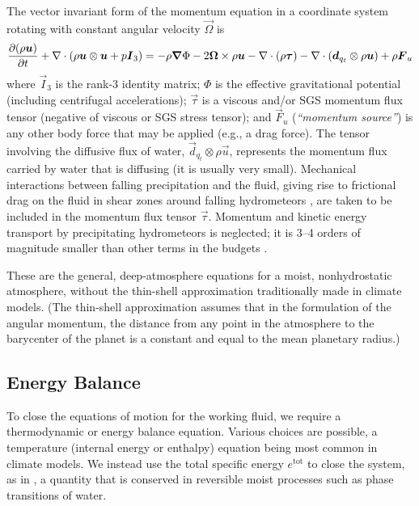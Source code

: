 \documentclass{report}
\begin{document}
The vector invariant form of the momentum equation in a coordinate system rotating with constant angular velocity $\vec{\Omega}$ is 
\begin{equation}
\frac{\partial (\rho\boldsymbol{{u}})}{\partial t} + \nabla \cdot \left( \rho\boldsymbol{{u}} \otimes \boldsymbol{{u}} + p \boldsymbol{{I}}_3\right) =  - \rho \boldsymbol{{\nabla}}\Phi - 2\boldsymbol{{\Omega}} \times \rho\boldsymbol{{u}} - \nabla \cdot (\rho \boldsymbol{{\tau}}) - \nabla \cdot\left( \boldsymbol{{d}}_{q_t} \otimes \rho\boldsymbol{{u}} \right) + \rho \boldsymbol{{F}}_u
\label{eq:governing_equations/momentum}
\end{equation}
where $\vec{I}_3$ is the rank-3 identity matrix; $\Phi$ is the effective gravitational potential (including centrifugal accelerations); $\vec{\tau}$ is a viscous and/or SGS momentum flux tensor (negative of viscous or SGS stress tensor); and $\vec{F}_u$ (\emph{``momentum source''}) is any other body force that may be applied (e.g., a drag force). The tensor involving the diffusive flux of water, $\vec{d}_{q_t} \otimes \rho\vec{u}$, represents the momentum flux carried by water that is diffusing (it is usually very small). Mechanical interactions between falling precipitation and the fluid, giving rise to frictional drag on the fluid in shear zones around falling hydrometeors \citep{Pauluis00}, are taken to be included in the momentum flux tensor $\vec{\tau}$. Momentum and kinetic energy transport by precipitating hydrometeors is neglected; it is 3--4 orders of magnitude smaller than other terms in the budgets \citep{Romps08a}.

These are the general, deep-atmosphere equations for a moist, nonhydrostatic atmosphere, without the thin-shell approximation traditionally made in climate models. (The thin-shell approximation assumes that in the formulation of the angular momentum, the distance from any point in the atmosphere to the barycenter of the planet is a constant and equal to the mean planetary radius.)

\subsection{Energy Balance}\label{s:energy_balance}

To close the equations of motion for the working fluid, we require a thermodynamic or energy balance equation. Various choices are possible, a temperature (internal energy or enthalpy) equation being most common in climate models. We instead use the total specific energy $e^\mathrm{tot}$ to close the system, as in \citet{Romps08a}, a quantity that is conserved in reversible moist processes such as phase transitions of water. 
\end{document}
